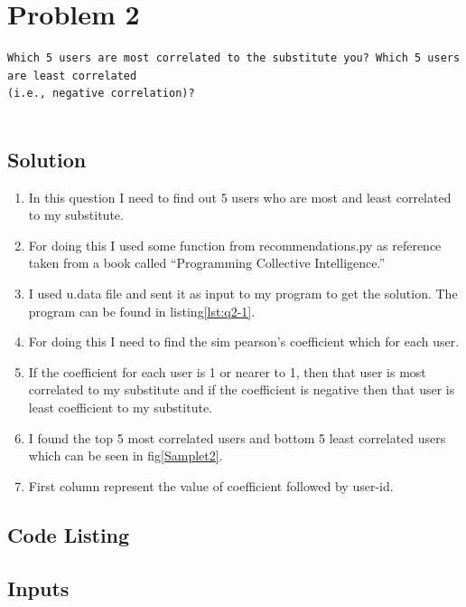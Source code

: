 

\section{Problem 2}
\label{part2}
\begin{verbatim}
Which 5 users are most correlated to the substitute you? Which 5 users are least correlated 
(i.e., negative correlation)?


\end{verbatim}

\subsection{Solution}
\begin{enumerate}
\item In this question I need to find out 5 users who are most and least correlated to my substitute.
\item For doing this I used some function from recommendations.py as reference taken from a book called ``Programming Collective Intelligence.''
\item I used u.data file and sent it as input to my program to get the solution. The program can be found in listing\ref{lst:q2-1}.
\item For doing this I need to find the sim pearson's coefficient which for each user.
\item If the coefficient for each user is 1 or nearer to 1, then that user is most correlated to my substitute and if the coefficient is negative then that user is least coefficient to my substitute.
\item I found the top 5 most correlated users and bottom 5 least correlated users which can be seen in fig\ref{Samplet2}.
\item First column represent the value of coefficient followed by user-id.
\end{enumerate}
\newpage

\subsection{Code Listing}


\newpage

\subsection{Inputs}
